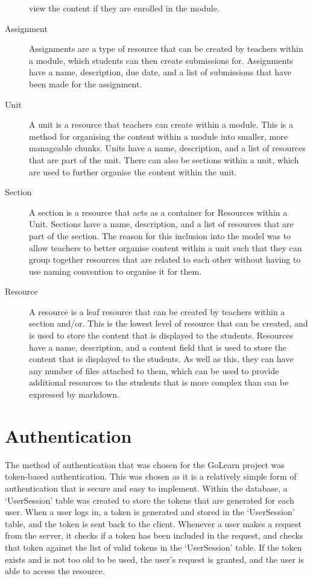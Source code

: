 \documentclass[12pt, a4paper,twoside]{report}
\theoremstyle{plain} %
\theoremstyle{definition} %
\numberwithin{equation}{chapter}
\begin{document}
\begin{description}
{        view the content if they are enrolled in the module.
        }
    \item[Assignment] {
        Assignments are a type of resource that can be created by teachers within
        a module, which students can then create submissions for. Assignments
        have a name, description, due date, and a list of submissions that have
        been made for the assignment.
        }
    \item[Unit] {
        A unit is a resource that teachers can create within a module. This is a
        method for organising the content within a module into smaller, more
        manageable chunks. Units have a name, description, and a list of resources
        that are part of the unit. There can also be sections within a unit, which
        are used to further organise the content within the unit.
        }
    \item[Section] {
        A section is a resource that acts as a container for Resources within a
        Unit. Sections have a name, description, and a list of resources that are
        part of the section. The reason for this inclusion into the model was to
        allow teachers to better organise content within a unit such that they can
        group together resources that are related to each other without having to
        use naming convention to organise it for them.
        }
    \item[Resource] {
        A resource is a leaf resource that can be created by teachers within a
        section and/or. This is the lowest level of resource that can be created,
        and is used to store the content that is displayed to the students. Resources
        have a name, description, and a content field that is used to store the
        content that is displayed to the students. As well as this, they can have any
        number of files attached to them, which can be used to provide additional
        resources to the students that is more complex than can be expressed by
        markdown.
        }
\end{description}

\section{Authentication}\label{sec:authentication}

The method of authentication that was chosen for the GoLearn project was token-based
authentication. This was chosen as it is a relatively simple form of authentication
that is secure and easy to implement. Within the database, a `UserSession' table was
created to store the tokens that are generated for each user. When a user logs in,
a token is generated and stored in the `UserSession' table, and the token is sent
back to the client. Whenever a user makes a request from the server, it checks if
a token has been included in the request, and checks that token against the list of
valid tokens in the `UserSession' table. If the token exists and is not too old to
be used, the user's request is granted, and the user is able to access the resource.
\end{document}
